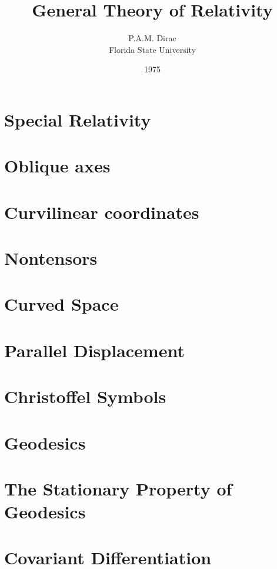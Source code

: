 \documentclass[10pt]{article}
\title{General Theory of Relativity}
\author{P.A.M. Dirac\\Florida State University}
\date{1975}
\begin{document}
\maketitle
\section{Special Relativity}

\section{Oblique axes}

\section{Curvilinear coordinates}

\section{Nontensors}

\section{Curved Space}

\section{Parallel Displacement}

\section{Christoffel Symbols}

\section{Geodesics}

\section{The Stationary Property of Geodesics}

\section{Covariant Differentiation}

\end{document}
